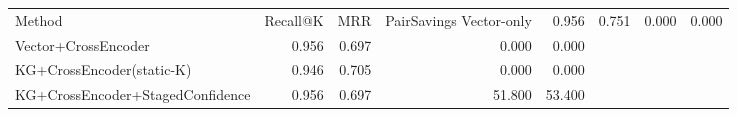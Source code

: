 \begin{tabular}{lrrrr}
\toprule
Method & Recall@K & MRR & PairSavings%
\midrule
Vector-only & 0.956 & 0.751 & 0.000 & 0.000 \\
Vector+CrossEncoder & 0.956 & 0.697 & 0.000 & 0.000 \\
KG+CrossEncoder(static-K) & 0.946 & 0.705 & 0.000 & 0.000 \\
KG+CrossEncoder+StagedConfidence & 0.956 & 0.697 & 51.800 & 53.400 \\
\bottomrule
\end{tabular}
